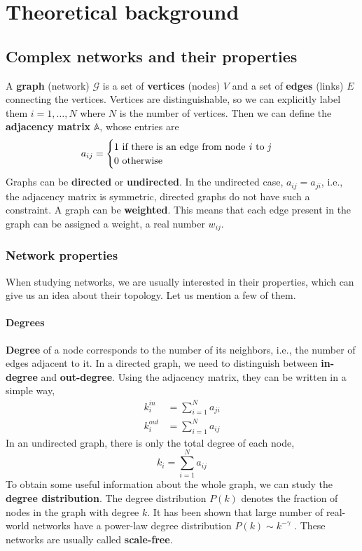 \chapter{Theoretical background}
\section{Complex networks and their properties}
A \textbf{graph} (network) $\mathcal{G}$ is a set of \textbf{vertices} (nodes) $V$ and a set of \textbf{edges} (links) $E$ connecting the vertices. Vertices are distinguishable, so we can explicitly label them $i = 1,\dots,N$ where $N$ is the number of vertices. Then we can define the \textbf{adjacency matrix} $\mathbb{A}$, whose entries are
\begin{equation*}
a_{ij} = \begin{cases}
1 \text{ if there is an edge from node \textit{i} to \textit{j}} \\
0 \text{ otherwise}
\end{cases}
\end{equation*}
Graphs can be \textbf{directed} or \textbf{undirected}. In the undirected case, $a_{ij} = a_{ji}$, i.e., the adjacency matrix is symmetric, directed graphs do not have such a constraint.
A graph can be \textbf{weighted}. This means that each edge present in the graph can be assigned a weight, a real number $w_{ij}$.
\subsection{Network properties}
When studying networks, we are usually interested in their properties, which can give us an idea about their topology. Let us mention a few of them.
\subsubsection{Degrees}
\textbf{Degree} of a node corresponds to the number of its neighbors, i.e., the number of edges adjacent to it. In a directed graph, we need to distinguish between \textbf{in-degree} and \textbf{out-degree}. Using the adjacency matrix, they can be written in a simple way,
\begin{align}
k_i^{in} &= \sum_{i=1}^{N} a_{ji} \\
k_i^{out} &= \sum_{i=1}^{N} a_{ij}
\end{align}
In an undirected graph, there is only the total degree of each node,
\begin{equation}
k_i = \sum_{i=1}^{N} a_{ij}
\end{equation}
To obtain some useful information about the whole graph, we can study the \textbf{degree distribution}. The degree distribution $P(k)$ denotes the fraction of nodes in the graph with degree $k$. It has been shown that large number of real-world networks have a power-law degree distribution $P(k) \sim k^{-\gamma}$ \cite{Barabasi1999}. These networks are usually called \textbf{scale-free}.
